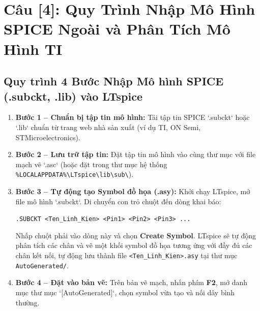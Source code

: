 \documentclass[12pt,a4paper]{report}
\begin{document}
\section*{Câu [4]: Quy Trình Nhập Mô Hình SPICE Ngoài và Phân Tích Mô Hình TI}

\subsection{Quy trình 4 Bước Nhập Mô hình SPICE (.subckt, .lib) vào LTspice}
\begin{enumerate}
    \item \textbf{Bước 1 -- Chuẩn bị tập tin mô hình:} Tải tập tin SPICE `.subckt` hoặc `.lib` chuẩn từ trang web nhà sản xuất (ví dụ TI, ON Semi, STMicroelectronics).
    \item \textbf{Bước 2 -- Lưu trữ tập tin:} Đặt tập tin mô hình vào cùng thư mục với file mạch vẽ `.asc` (hoặc đặt trong thư mục hệ thống \texttt{\%LOCALAPPDATA\%\textbackslash LTspice\textbackslash lib\textbackslash sub\textbackslash}).
    \item \textbf{Bước 3 -- Tự động tạo Symbol đồ họa (.asy):} Khởi chạy LTspice, mở file mô hình `.subckt`. Di chuyển con trỏ chuột đến dòng khai báo:
    \begin{center}
        \texttt{.SUBCKT <Ten\_Linh\_Kien> <Pin1> <Pin2> <Pin3> ...}
    \end{center}
    Nhấp chuột phải vào dòng này và chọn \textbf{Create Symbol}. LTspice sẽ tự động phân tích các chân và vẽ một khối symbol đồ họa tương ứng với đầy đủ các chân kết nối, tự động lưu thành file \texttt{<Ten\_Linh\_Kien>.asy} tại thư mục \texttt{AutoGenerated/}.
    \item \textbf{Bước 4 -- Đặt vào bản vẽ:} Trên bản vẽ mạch, nhấn phím \textbf{F2}, mở danh mục thư mục `[AutoGenerated]`, chọn symbol vừa tạo và nối dây bình thường.
\end{enumerate}
\end{document}

